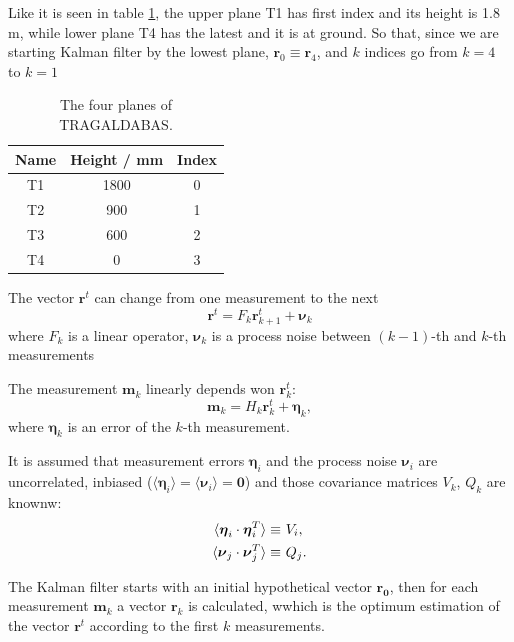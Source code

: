 \documentclass[a4paper]{book}
\let\vec\mathbf  %
\begin{document}
Like it is seen in table \ref{tb:planes}, the upper plane T1 has first index and its height is 1.8 m, while lower plane T4 has the latest and it is at ground. So that, since we are starting Kalman filter by the lowest plane, $\vec{r}_0 \equiv \vec{r}_4$, and $k$ indices go from $k=4$ to $k=1$

\begin{table}[h!]
\centering
\begin{tabular}{@{}ccc@{}}
\toprule
Name & Height / mm & Index \\ \midrule
T1   & 1800        & 0     \\
T2   & 900         & 1     \\
T3   & 600         & 2     \\
T4   & 0           & 3     \\ \bottomrule
\end{tabular}
\caption{The four planes of TRAGALDABAS.}
\label{tb:planes}
\end{table}

The vector $\vec{r}^t$ can change from one measurement to the next
\begin{equation}
\vec{r}^t = F_k \vec{r}^t_{k+1} + \boldsymbol\nu_k 
\label{eq:rtk}
\end{equation}
where $F_k$ is a linear operator, $\boldsymbol\nu_k$ is a process noise between $(k -1)$-th and $k$-th measurements

The measurement $\vec{m}_k$ linearly depends won $\vec{r}^t_k$:
\begin{equation}
\vec{m}_k = H_k \vec{r}^t_k + \boldsymbol\eta_k,
\label{eq:mk}
\end{equation}
where $\boldsymbol\eta_k$ is an error of the $k$-th measurement.

It is assumed that measurement errors $\boldsymbol\eta_i$ and the process noise $\boldsymbol\nu_i$ are uncorrelated, inbiased ($\langle \boldsymbol\eta_i \rangle = \langle \boldsymbol\nu_i \rangle   = \vec{0} $) and those covariance matrices $V_k$, $Q_k$ are knownw:
\begin{align}
\notag
\langle \boldsymbol\eta_i \cdot \boldsymbol\eta_i^T \rangle \equiv &\ V_i, \\
\langle \boldsymbol\nu_j \cdot \boldsymbol\nu_j^T \rangle \equiv &\ Q_j.
\label{eq:VQ}
\end{align}

The Kalman filter starts with an initial hypothetical vector $\vec{r_0}$, then for each measurement $\vec{m}_k$ a vector $\vec{r}_k$ is calculated, wwhich is the optimum estimation of the vector $\vec{r}^t$ according to the first $k$ measurements.
\end{document}
